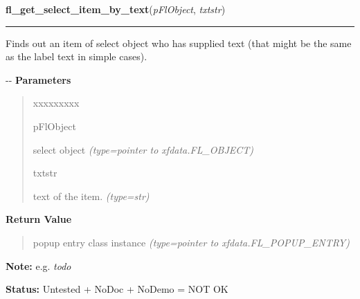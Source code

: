 \hspace{.8\funcindent}\begin{boxedminipage}{\funcwidth}

    \raggedright \textbf{fl\_get\_select\_item\_by\_text}(\textit{pFlObject}, \textit{txtstr})

    \vspace{-1.5ex}

    \rule{\textwidth}{0.5\fboxrule}
\setlength{\parskip}{2ex}

Finds out an item of select object who has supplied text (that might
be the same as the label text in simple cases).

-{}-
\setlength{\parskip}{1ex}
      \textbf{Parameters}
      \vspace{-1ex}

      \begin{quote}
        \begin{Ventry}{xxxxxxxxx}

          \item[pFlObject]


select object
            {\it (type=pointer to xfdata.FL\_OBJECT)}

          \item[txtstr]


text of the item.
            {\it (type=str)}

        \end{Ventry}

      \end{quote}

      \textbf{Return Value}
    \vspace{-1ex}

      \begin{quote}

popup entry class instance
      {\it (type=pointer to xfdata.FL\_POPUP\_ENTRY)}

      \end{quote}

\textbf{Note:} 
e.g. \emph{todo}


\textbf{Status:} 
Untested + NoDoc + NoDemo = NOT OK


    \end{boxedminipage}

    \label{xformslib:flselect:fl_get_select_text_color}

    \vspace{0.5ex}

